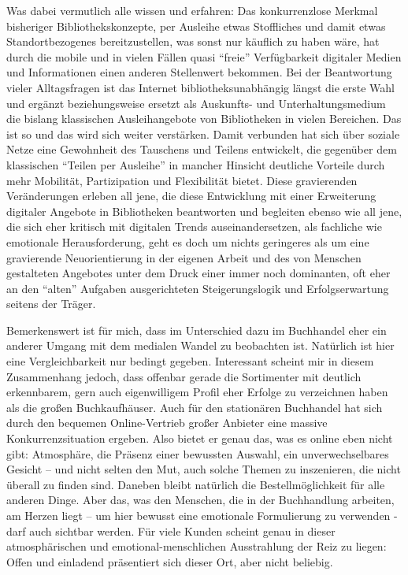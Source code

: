 \documentclass[a4paper,
fontsize=11pt,
oneside,
numbers=noperiodatend,
parskip=half-,
bibliography=totoc,
final
]{scrartcl}
\begin{document}
Was dabei vermutlich alle wissen und erfahren: Das konkurrenzlose
Merkmal bisheriger Bibliothekskonzepte, per Ausleihe etwas Stoffliches
und damit etwas Standortbezogenes bereitzustellen, was sonst nur
käuflich zu haben wäre, hat durch die mobile und in vielen Fällen quasi
\enquote{freie} Verfügbarkeit digitaler Medien und Informationen einen
anderen Stellenwert bekommen. Bei der Beantwortung vieler Alltagsfragen
ist das Internet bibliotheksunabhängig längst die erste Wahl und ergänzt
beziehungsweise ersetzt als Auskunfts- und Unterhaltungsmedium die
bislang klassischen Ausleihangebote von Bibliotheken in vielen
Bereichen. Das ist so und das wird sich weiter verstärken. Damit
verbunden hat sich über soziale Netze eine Gewohnheit des Tauschens und
Teilens entwickelt, die gegenüber dem klassischen \enquote{Teilen per
Ausleihe} in mancher Hinsicht deutliche Vorteile durch mehr Mobilität,
Partizipation und Flexibilität bietet. Diese gravierenden Veränderungen
erleben all jene, die diese Entwicklung mit einer Erweiterung digitaler
Angebote in Bibliotheken beantworten und begleiten ebenso wie all jene,
die sich eher kritisch mit digitalen Trends auseinandersetzen, als
fachliche wie emotionale Herausforderung, geht es doch um nichts
geringeres als um eine gravierende Neuorientierung in der eigenen Arbeit
und des von Menschen gestalteten Angebotes unter dem Druck einer immer
noch dominanten, oft eher an den \enquote{alten} Aufgaben ausgerichteten
Steigerungslogik und Erfolgserwartung seitens der Träger.

Bemerkenswert ist für mich, dass im Unterschied dazu im Buchhandel eher
ein anderer Umgang mit dem medialen Wandel zu beobachten ist. Natürlich
ist hier eine Vergleichbarkeit nur bedingt gegeben. Interessant scheint
mir in diesem Zusammenhang jedoch, dass offenbar gerade die Sortimenter
mit deutlich erkennbarem, gern auch eigenwilligem Profil eher Erfolge zu
verzeichnen haben als die großen Buchkaufhäuser. Auch für den
stationären Buchhandel hat sich durch den bequemen Online-Vertrieb
großer Anbieter eine massive Konkurrenzsituation ergeben. Also bietet er
genau das, was es online eben nicht gibt: Atmosphäre, die Präsenz einer
bewussten Auswahl, ein unverwechselbares Gesicht -- und nicht selten den
Mut, auch solche Themen zu inszenieren, die nicht überall zu finden
sind. Daneben bleibt natürlich die Bestellmöglichkeit für alle anderen
Dinge. Aber das, was den Menschen, die in der Buchhandlung arbeiten, am
Herzen liegt -- um hier bewusst eine emotionale Formulierung zu
verwenden - darf auch sichtbar werden. Für viele Kunden scheint genau in
dieser atmosphärischen und emotional-menschlichen Ausstrahlung der Reiz
zu liegen: Offen und einladend präsentiert sich dieser Ort, aber nicht
beliebig.
\end{document}

